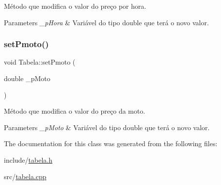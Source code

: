 Método que modifica o valor do preço por hora. 


\begin{DoxyParams}{Parameters}
{\em \+\_\+p\+Hora} & Variável do tipo double que terá o novo valor. \\
\hline
\end{DoxyParams}
\mbox{\label{classTabela_af3cb0073ed37888bf632746a06f574d0}} 
\subsubsection{\texorpdfstring{set\+Pmoto()}{setPmoto()}}
{\footnotesize\ttfamily void Tabela\+::set\+Pmoto (\begin{DoxyParamCaption}\item[{double}]{\+\_\+p\+Moto }\end{DoxyParamCaption})}



Método que modifica o valor do preço da moto. 


\begin{DoxyParams}{Parameters}
{\em \+\_\+p\+Moto} & Variável do tipo double que terá o novo valor. \\
\hline
\end{DoxyParams}


The documentation for this class was generated from the following files\+:\begin{DoxyCompactItemize}
\item 
include/\hyperlink{tabela_8h}{tabela.\+h}\item 
src/\hyperlink{tabela_8cpp}{tabela.\+cpp}\end{DoxyCompactItemize}
